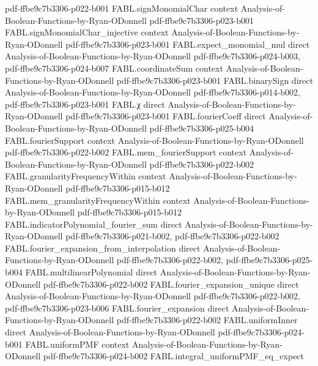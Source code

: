 \begin{theorem}
  {pdf-ffbe9c7b3306-p022-b001}
\proofstep
  {FABL.signMonomialChar}
  {context}
  {Analysis-of-Boolean-Functions-by-Ryan-ODonnell}
  {pdf-ffbe9c7b3306-p023-b001}
\proofstep
  {FABL.signMonomialChar_injective}
  {context}
  {Analysis-of-Boolean-Functions-by-Ryan-ODonnell}
  {pdf-ffbe9c7b3306-p023-b001}
\proofstep
  {FABL.expect_monomial_mul}
  {direct}
  {Analysis-of-Boolean-Functions-by-Ryan-ODonnell}
  {pdf-ffbe9c7b3306-p024-b003,
    pdf-ffbe9c7b3306-p024-b007}
\proofstep
  {FABL.coordinateSum}
  {context}
  {Analysis-of-Boolean-Functions-by-Ryan-ODonnell}
  {pdf-ffbe9c7b3306-p023-b001}
\proofstep
  {FABL.binarySign}
  {direct}
  {Analysis-of-Boolean-Functions-by-Ryan-ODonnell}
  {pdf-ffbe9c7b3306-p014-b002,
    pdf-ffbe9c7b3306-p023-b001}
\proofstep
  {FABL.χ}
  {direct}
  {Analysis-of-Boolean-Functions-by-Ryan-ODonnell}
  {pdf-ffbe9c7b3306-p023-b001}
\proofstep
  {FABL.fourierCoeff}
  {direct}
  {Analysis-of-Boolean-Functions-by-Ryan-ODonnell}
  {pdf-ffbe9c7b3306-p025-b004}
\proofstep
  {FABL.fourierSupport}
  {context}
  {Analysis-of-Boolean-Functions-by-Ryan-ODonnell}
  {pdf-ffbe9c7b3306-p022-b002}
\proofstep
  {FABL.mem_fourierSupport}
  {context}
  {Analysis-of-Boolean-Functions-by-Ryan-ODonnell}
  {pdf-ffbe9c7b3306-p022-b002}
\proofstep
  {FABL.granularityFrequencyWithin}
  {context}
  {Analysis-of-Boolean-Functions-by-Ryan-ODonnell}
  {pdf-ffbe9c7b3306-p015-b012}
\proofstep
  {FABL.mem_granularityFrequencyWithin}
  {context}
  {Analysis-of-Boolean-Functions-by-Ryan-ODonnell}
  {pdf-ffbe9c7b3306-p015-b012}
\proofstep
  {FABL.indicatorPolynomial_fourier_sum}
  {direct}
  {Analysis-of-Boolean-Functions-by-Ryan-ODonnell}
  {pdf-ffbe9c7b3306-p021-b002,
    pdf-ffbe9c7b3306-p022-b002}
\proofstep
  {FABL.fourier_expansion_from_interpolation}
  {direct}
  {Analysis-of-Boolean-Functions-by-Ryan-ODonnell}
  {pdf-ffbe9c7b3306-p022-b002,
    pdf-ffbe9c7b3306-p025-b004}
\proofstep
  {FABL.multilinearPolynomial}
  {direct}
  {Analysis-of-Boolean-Functions-by-Ryan-ODonnell}
  {pdf-ffbe9c7b3306-p022-b002}
\proofstep
  {FABL.fourier_expansion_unique}
  {direct}
  {Analysis-of-Boolean-Functions-by-Ryan-ODonnell}
  {pdf-ffbe9c7b3306-p022-b002,
    pdf-ffbe9c7b3306-p023-b006}
\proofstep
  {FABL.fourier_expansion}
  {direct}
  {Analysis-of-Boolean-Functions-by-Ryan-ODonnell}
  {pdf-ffbe9c7b3306-p022-b002}
\proofstep
  {FABL.uniformInner}
  {direct}
  {Analysis-of-Boolean-Functions-by-Ryan-ODonnell}
  {pdf-ffbe9c7b3306-p024-b001}
\proofstep
  {FABL.uniformPMF}
  {context}
  {Analysis-of-Boolean-Functions-by-Ryan-ODonnell}
  {pdf-ffbe9c7b3306-p024-b002}
\proofstep
  {FABL.integral_uniformPMF_eq_expect}

\end{theorem}
